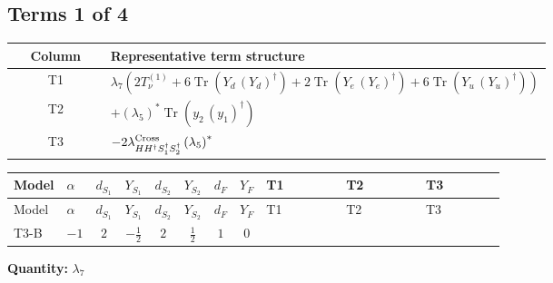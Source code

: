 \documentclass[8pt]{article}
\begin{document}
\begin{landscape}
\subsection*{Terms 1 of 4}
\begin{center}
\begin{tabular}{@{}c >{\raggedright\arraybackslash}p{0.82\linewidth}@{}}
\toprule
Column & Representative term structure \\
\midrule
T1 & \(\displaystyle {\lambda_{7}} (2 T_{\nu}^{(1)}+6 \operatorname{Tr}\!\left({Y_d}\,\left({Y_d}\right)^{\dagger}\right)+2 \operatorname{Tr}\!\left({Y_e}\,\left({Y_e}\right)^{\dagger}\right)+6 \operatorname{Tr}\!\left({Y_u}\,\left({Y_u}\right)^{\dagger}\right))\) \\
\midrule
T2 & \(\displaystyle +\left({\lambda_5}\right)^{*} \operatorname{Tr}\!\left({y_2}\,\left({y_1}\right)^{\dagger}\right)\) \\
\midrule
T3 & \(\displaystyle -2 {\lambda_{H H^\dagger S_1^\dagger S_2^\dagger}^{\rm Cross}} \left({\lambda_5}\right)^{*}\) \\
\midrule
\bottomrule
\end{tabular}
\end{center}
\smallskip
\tiny
\begin{longtable}{@{}llcccccc >{\raggedright\arraybackslash}p{0.21\linewidth} >{\raggedright\arraybackslash}p{0.21\linewidth} >{\raggedright\arraybackslash}p{0.21\linewidth}@{}}
\toprule
Model & $\alpha$ & $d_{S_1}$ & $Y_{S_1}$ & $d_{S_2}$ & $Y_{S_2}$ & $d_F$ & $Y_F$ & T1 & T2 & T3 \\
\midrule
\endfirsthead
\toprule
Model & $\alpha$ & $d_{S_1}$ & $Y_{S_1}$ & $d_{S_2}$ & $Y_{S_2}$ & $d_F$ & $Y_F$ & T1 & T2 & T3 \\
\midrule
\endhead
T3-B & $-1$ & $2$ & $-\frac{1}{2}$ & $2$ & $\frac{1}{2}$ & $1$ & $0$ & \scriptsize\adjustbox{max width=\linewidth}{$\begin{gathered} {\lambda_{7}} (2 T_{\nu}^{(1)}+6 \operatorname{Tr}\!\left({Y_d}\,\left({Y_d}\right)^{\dagger}\right)+2 \operatorname{Tr}\!\left({Y_e}\,\left({Y_e}\right)^{\dagger}\right)+6 \operatorname{Tr}\!\left({Y_u}\,\left({Y_u}\right)^{\dagger}\right))\end{gathered}$} & \scriptsize\adjustbox{max width=\linewidth}{$\begin{gathered} +\left({\lambda_5}\right)^{*} \operatorname{Tr}\!\left({y_2}\,\left({y_1}\right)^{\dagger}\right)\end{gathered}$} & \scriptsize\adjustbox{max width=\linewidth}{$\begin{gathered} -2 {\lambda_{H H^\dagger S_1^\dagger S_2^\dagger}^{\rm Cross}} \left({\lambda_5}\right)^{*}\end{gathered}$} \\
\midrule
\bottomrule
\end{longtable}
\clearpage
\noindent\textbf{Quantity: }$\lambda_{7}$\par\smallskip

\end{landscape}
\end{document}
